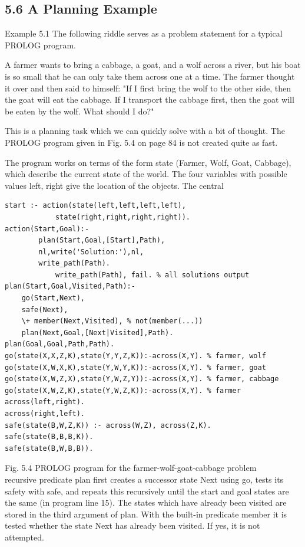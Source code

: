 \documentclass[10pt]{article}
\begin{document}
\subsection*{5.6 A Planning Example}
Example 5.1 The following riddle serves as a problem statement for a typical PROLOG program.

A farmer wants to bring a cabbage, a goat, and a wolf across a river, but his boat is so small that he can only take them across one at a time. The farmer thought it over and then said to himself: "If I first bring the wolf to the other side, then the goat will eat the cabbage. If I transport the cabbage first, then the goat will be eaten by the wolf. What should I do?"

This is a planning task which we can quickly solve with a bit of thought. The PROLOG program given in Fig. 5.4 on page 84 is not created quite as fast.

The program works on terms of the form state (Farmer, Wolf, Goat, Cabbage), which describe the current state of the world. The four variables with possible values left, right give the location of the objects. The central

\begin{verbatim}
start :- action(state(left,left,left,left),
            state(right,right,right,right)).
action(Start,Goal):-
        plan(Start,Goal,[Start],Path),
        nl,write('Solution:'),nl,
        write_path(Path).
            write_path(Path), fail. % all solutions output
plan(Start,Goal,Visited,Path):-
    go(Start,Next),
    safe(Next),
    \+ member(Next,Visited), % not(member(...))
    plan(Next,Goal,[Next|Visited],Path).
plan(Goal,Goal,Path,Path).
go(state(X,X,Z,K),state(Y,Y,Z,K)):-across(X,Y). % farmer, wolf
go(state(X,W,X,K),state(Y,W,Y,K)):-across(X,Y). % farmer, goat
go(state(X,W,Z,X),state(Y,W,Z,Y)):-across(X,Y). % farmer, cabbage
go(state(X,W,Z,K),state(Y,W,Z,K)):-across(X,Y). % farmer
across(left,right).
across(right,left).
safe(state(B,W,Z,K)) :- across(W,Z), across(Z,K).
safe(state(B,B,B,K)).
safe(state(B,W,B,B)).
\end{verbatim}

Fig. 5.4 PROLOG program for the farmer-wolf-goat-cabbage problem\\

recursive predicate plan first creates a successor state Next using go, tests its safety with safe, and repeats this recursively until the start and goal states are the same (in program line 15). The states which have already been visited are stored in the third argument of plan. With the built-in predicate member it is tested whether the state Next has already been visited. If yes, it is not attempted.
\end{document}
